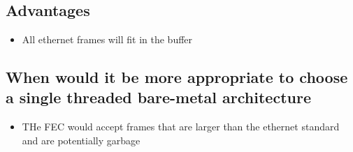 \section{}
\subsection*{Advantages}
\begin{itemize}
  \item All ethernet frames will fit in the buffer
\end{itemize}

\subsection*{When would it be more appropriate to choose a single threaded
  bare-metal architecture}

\begin{itemize}
  \item THe FEC would accept frames that are larger than the ethernet standard
    and are potentially garbage
\end{itemize}
